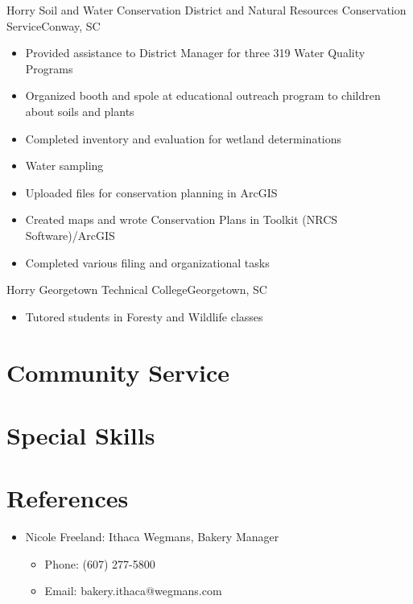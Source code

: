 \documentclass[11pt,a4paper,sans]{moderncv}        %
\begin{document}
{}
{Horry Soil and Water Conservation District and Natural Resources Conservation Service}{Conway, SC}{
\begin{itemize}
\item
Provided assistance to District Manager for three 319 Water Quality Programs
\item
Organized booth and spole at educational outreach program to children about soils and plants
\item
Completed inventory and evaluation for wetland determinations
\item
Water sampling
\item
Uploaded files for conservation planning in ArcGIS
\item
Created maps and wrote Conservation Plans in Toolkit (NRCS Software)/ArcGIS
\item
Completed various filing and organizational tasks
\end{itemize}
}%

{}
{Horry Georgetown Technical College}{Georgetown, SC}{
\begin{itemize}
\item
Tutored students in Foresty and Wildlife classes
\end{itemize}
}%


\section{Community Service}


\section{Special Skills}



\section{References}
\begin{itemize}
\item
Nicole Freeland: Ithaca Wegmans, Bakery Manager
\begin{itemize}
\item
Phone: (607) 277-5800
\item
Email: bakery.ithaca@wegmans.com
\end{itemize}
\end{itemize}


% 
\end{document}
